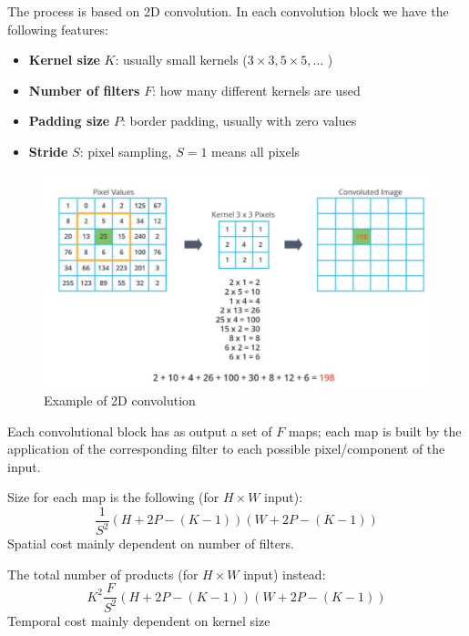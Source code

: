 \begin{paracol}{2}
   
   The process is based on 2D convolution.
   In each convolution block we have the following features:
   \begin{itemize}
      \item \textbf{Kernel size} $K$: usually small kernels ($3\times 3, 5\times 5, \dots$ )
      \item \textbf{Number of filters} $F$: how many different kernels are used
      \item \textbf{Padding size} $P$: border padding, usually with zero values
      \item \textbf{Stride} $S$: pixel sampling, $S = 1$ means all pixels
   \end{itemize}

   \switchcolumn

   \begin{figure}[htbp]
      \centering
      \includegraphics{images/10/convolution2d.png}
      \caption{Example of 2D convolution}
      \label{fig:10/convolution2d}
   \end{figure}
\end{paracol}

Each convolutional block has as output a set of $F$ maps; 
each map is built by the application of the corresponding filter to each possible pixel/component of the input.
\nl

Size for each map is the following (for $H\times W$ input):
\[\frac{1}{S^2} (H + 2P - (K - 1))(W + 2P - (K-1))\]
Spatial cost mainly dependent on number of filters.
\nl

The total number of products (for $H\times W$ input) instead: 
\[K^2\frac{F}{S^2} (H + 2P - (K - 1))(W + 2P - (K-1))\]
Temporal cost mainly dependent on kernel size

